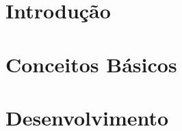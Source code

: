 \documentclass[
	12pt,				%
	openright,			%
	twoside,			%
	a4paper,			%
	english,			%
	french,				%
	spanish,			%
	brazil				%
	]{abntex2}
\begin{document}

\frenchspacing 




\part{Introdução}






\part{Conceitos Básicos}











\part{Desenvolvimento}










\end{document}
